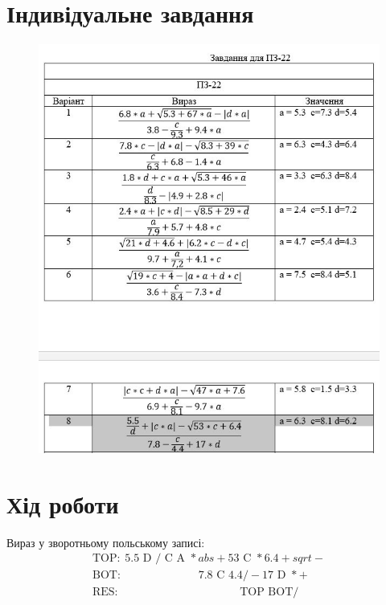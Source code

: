 \documentclass{article}
\begin{document}
\begin{normalsize}
		\section*{Індивідуальне завдання}
		\begin{figure}[H]
			\centering
			\includegraphics[scale=0.6]{v}
		\end{figure}
		
		\section*{Хід роботи}
		Вираз у зворотньому польському записі:
		\begin{gather}
			\text{TOP:} \hspace{5pt}5.5\text{ D }/\text{ C A }* abs + 53\text{ C }* 6.4 + sqrt -\nonumber\\
			\text{BOT:} \hspace{83pt}7.8\text{ C }4.4 / -  17\text{ D }* +\nonumber\\
			\text{RES:} \hspace{130pt}\text{TOP BOT} /\nonumber
		\end{gather}

\end{normalsize}
\end{document}
